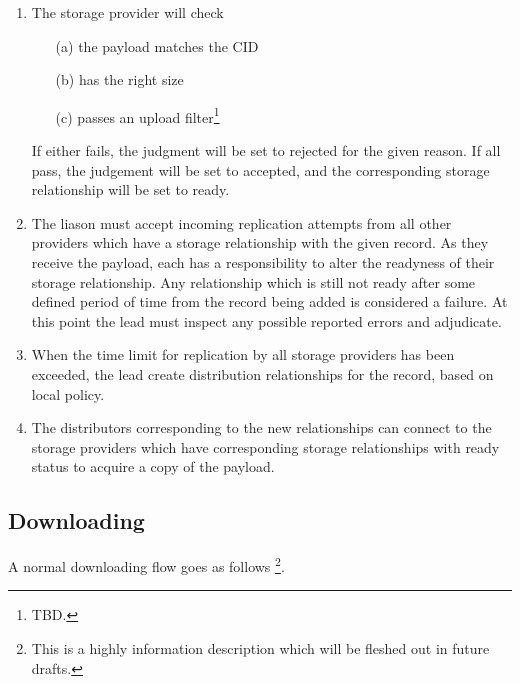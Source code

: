 \documentclass{article}
\begin{document}
\begin{enumerate}
\item
The storage provider will check

      \begin{itemize}

      \item[(a)] the payload matches the CID

      \item[(b)] has the right size

      \item[(c)] passes an upload filter\footnote{TBD.}

      \end{itemize}

If either fails, the judgment will be set to rejected for the given reason. If all pass, the judgement will be set to accepted, and the corresponding storage relationship will be set to ready.

\item
The liason must accept incoming replication attempts from all other providers which have a storage relationship with the given record. As they receive the payload, each has a responsibility to alter the readyness of their storage relationship. Any relationship which is still not ready after some defined period of time from the record being added is considered a failure. At this point the lead must inspect any possible reported errors and adjudicate.

\item
When the time limit for replication by all storage providers has been exceeded, the lead create distribution relationships for the record, based on local policy.

\item
The distributors corresponding to the new relationships can connect to the storage providers which have corresponding storage relationships with ready status to acquire a copy of the payload.

\end{enumerate}

\subsection{Downloading}

A normal downloading flow goes as follows \footnote{This is a highly information description which will be fleshed out in future drafts.}.

\end{document}
